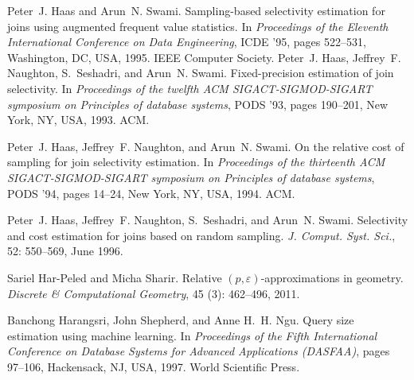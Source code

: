 \begin{thebibliography}{67}
Peter~J. Haas and Arun~N. Swami.
\newblock Sampling-based selectivity estimation for joins using augmented
  frequent value statistics.
\newblock In \emph{Proceedings of the Eleventh International Conference on Data
  Engineering}, ICDE '95, pages 522--531, Washington, DC, USA, 1995. IEEE
  Computer Society.
%
Peter~J. Haas, Jeffrey~F. Naughton, S.~Seshadri, and Arun~N. Swami.
\newblock Fixed-precision estimation of join selectivity.
\newblock In \emph{Proceedings of the twelfth ACM SIGACT-SIGMOD-SIGART
  symposium on Principles of database systems}, PODS '93, pages 190--201, New
  York, NY, USA, 1993. ACM.

Peter~J. Haas, Jeffrey~F. Naughton, and Arun~N. Swami.
\newblock On the relative cost of sampling for join selectivity estimation.
\newblock In \emph{Proceedings of the thirteenth ACM SIGACT-SIGMOD-SIGART
  symposium on Principles of database systems}, PODS '94, pages 14--24, New
  York, NY, USA, 1994. ACM.

Peter~J. Haas, Jeffrey~F. Naughton, S.~Seshadri, and Arun~N. Swami.
\newblock Selectivity and cost estimation for joins based on random sampling.
\newblock \emph{J. Comput. Syst. Sci.}, 52: 550--569, June 1996.

Sariel Har-Peled and Micha Sharir.
\newblock Relative $(p,\varepsilon)$-approximations in geometry.
\newblock \emph{Discrete \& Computational Geometry}, 45 (3):
  462--496, 2011.

Banchong Harangsri, John Shepherd, and Anne H.~H. Ngu.
\newblock Query size estimation using machine learning.
\newblock In \emph{Proceedings of the Fifth International Conference on
  Database Systems for Advanced Applications (DASFAA)}, pages 97--106,
  Hackensack, NJ, USA, 1997. World Scientific Press.


\end{thebibliography}
